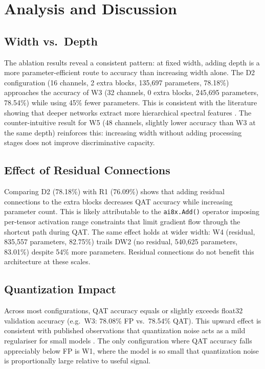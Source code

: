 \documentclass[conference]{IEEEtran}
\begin{document}
\section{Analysis and Discussion}

\subsection{Width vs.\ Depth}
The ablation results reveal a consistent pattern: at fixed width, adding depth is a more parameter-efficient route to accuracy than increasing width alone. The D2 configuration (16 channels, 2 extra blocks, 135,697 parameters, 78.18\%) approaches the accuracy of W3 (32 channels, 0 extra blocks, 245,695 parameters, 78.54\%) while using 45\% fewer parameters. This is consistent with the literature showing that deeper networks extract more hierarchical spectral features \cite{sprengel2016audio}. The counter-intuitive result for W5 (48 channels, slightly lower accuracy than W3 at the same depth) reinforces this: increasing width without adding processing stages does not improve discriminative capacity.

\subsection{Effect of Residual Connections}
Comparing D2 (78.18\%) with R1 (76.09\%) shows that adding residual connections to the extra blocks decreases QAT accuracy while increasing parameter count. This is likely attributable to the \texttt{ai8x.Add()} operator imposing per-tensor activation range constraints that limit gradient flow through the shortcut path during QAT. The same effect holds at wider width: W4 (residual, 835,557 parameters, 82.75\%) trails DW2 (no residual, 540,625 parameters, 83.01\%) despite 54\% more parameters. Residual connections do not benefit this architecture at these scales.

\subsection{Quantization Impact}
Across most configurations, QAT accuracy equals or slightly exceeds float32 validation accuracy (e.g.\ W3: 78.08\% FP vs.\ 78.54\% QAT). This upward effect is consistent with published observations that quantization noise acts as a mild regulariser for small models \cite{jacob2018quantization}. The only configuration where QAT accuracy falls appreciably below FP is W1, where the model is so small that quantization noise is proportionally large relative to useful signal.
\end{document}

